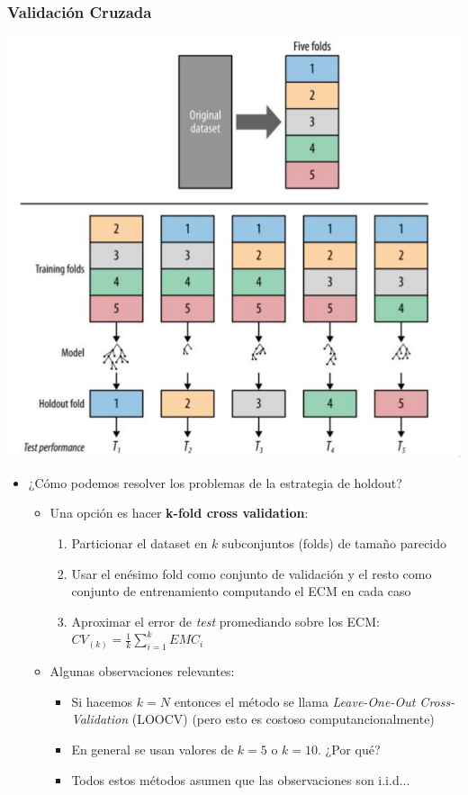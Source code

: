 \documentclass[leqno, 10pt, envcountsect]{beamer}
\numberwithin{equation}{section}
\theoremstyle{definition}
\theoremstyle{example}
\numberwithin{figure}{section}
\numberwithin{table}{section}
\let\olditem\item
\renewcommand{\item}{%
\olditem\vspace{1pt}}
\begin{document}
\begin{frame}
  \frametitle{Validación Cruzada}
  \begin{center}
    \includegraphics[scale=0.16]{cv_k_fold.png}
  \end{center}
  \begin{itemize}
    \item ¿Cómo podemos resolver los problemas de la estrategia de holdout?
      \begin{itemize}
        \item Una opción es hacer \textbf{k-fold cross validation}:
          \begin{enumerate}
            \item Particionar el dataset en $k$ subconjuntos (folds) de tamaño
              parecido
            \item Usar el enésimo fold como conjunto de validación y el resto
              como conjunto de entrenamiento computando el ECM en cada caso
            \item Aproximar el error de \textit{test} promediando sobre los
              ECM: $CV_{(k)} = \frac{1}{k}\sum_{i=1}^{k}EMC_{i}$
          \end{enumerate}
        \item Algunas observaciones relevantes:
          \begin{itemize}
            \item Si hacemos $k = N$ entonces el método se llama
              \textit{Leave-One-Out Cross-Validation} (LOOCV) (pero esto es
              costoso computancionalmente)
            \item En general se usan valores de $k=5$ o $k = 10$. ¿Por qué?
            \item Todos estos métodos asumen que las observaciones son
              i.i.d...
          \end{itemize}
          \end{itemize}
  \end{itemize}
\end{frame}
\end{document}
